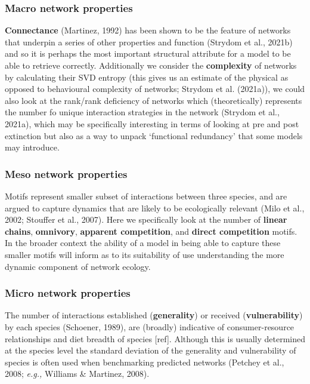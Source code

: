 \documentclass[
]{article}
\begin{document}
\subsubsection{Macro network properties}\label{macro-network-properties}

\textbf{Connectance} (Martinez, 1992) has been shown to be the feature
of networks that underpin a series of other properties and function
(Strydom et al., 2021b) and so it is perhaps the most important
structural attribute for a model to be able to retrieve correctly.
Additionally we consider the \textbf{complexity} of networks by
calculating their SVD entropy (this gives us an estimate of the physical
as opposed to behavioural complexity of networks; Strydom et al.
(2021a)), we could also look at the rank/rank deficiency of networks
which (theoretically) represents the number fo unique interaction
strategies in the network (Strydom et al., 2021a), which may be
specifically interesting in terms of looking at pre and post extinction
but also as a way to unpack `functional redundancy' that some models may
introduce.

\subsubsection{Meso network properties}\label{meso-network-properties}

Motifs represent smaller subset of interactions between three species,
and are argued to capture dynamics that are likely to be ecologically
relevant (Milo et al., 2002; Stouffer et al., 2007). Here we
specifically look at the number of \textbf{linear chains},
\textbf{omnivory}, \textbf{apparent competition}, and \textbf{direct
competition} motifs. In the broader context the ability of a model in
being able to capture these smaller motifs will inform as to its
suitability of use understanding the more dynamic component of network
ecology.

\subsubsection{Micro network properties}\label{micro-network-properties}

The number of interactions established (\textbf{generality}) or received
(\textbf{vulnerability}) by each species (Schoener, 1989), are (broadly)
indicative of consumer-resource relationships and diet breadth of
species {[}ref{]}. Although this is usually determined at the species
level the standard deviation of the generality and vulnerability of
species is often used when benchmarking predicted networks (Petchey et
al., 2008; \emph{e.g.,} Williams \& Martinez, 2008).
\end{document}
